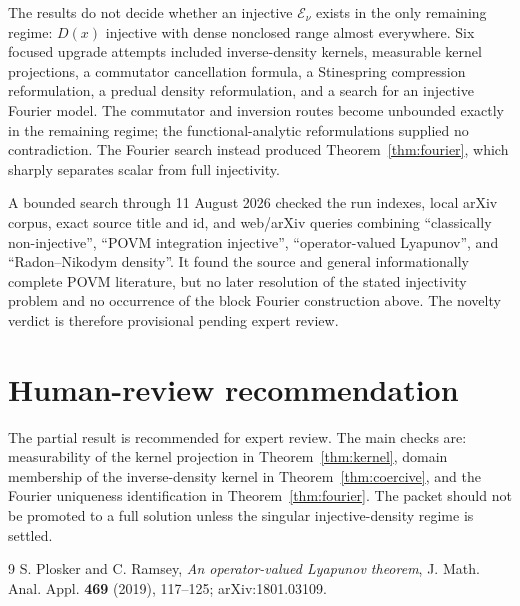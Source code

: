 \documentclass[11pt]{article}
\newcommand{\E}{\mathcal E}
\begin{document}
The results do not decide whether an injective $\E_\nu$ exists in the only
remaining regime: $D(x)$ injective with dense nonclosed range almost
everywhere.  Six focused upgrade attempts included inverse-density kernels,
measurable kernel projections, a commutator cancellation formula, a
Stinespring compression reformulation, a predual density reformulation, and
a search for an injective Fourier model.  The commutator and inversion routes
become unbounded exactly in the remaining regime; the functional-analytic
reformulations supplied no contradiction.  The Fourier search instead
produced Theorem~\ref{thm:fourier}, which sharply separates scalar from full
injectivity.

A bounded search through 11 August 2026 checked the run indexes, local arXiv
corpus, exact source title and id, and web/arXiv queries combining
``classically non-injective'', ``POVM integration injective'',
``operator-valued Lyapunov'', and ``Radon--Nikodym density''.  It found the
source and general informationally complete POVM literature, but no later
resolution of the stated injectivity problem and no occurrence of the block
Fourier construction above.  The novelty verdict is therefore provisional
pending expert review.

\section{Human-review recommendation}

The partial result is recommended for expert review.  The main checks are:
measurability of the kernel projection in Theorem~\ref{thm:kernel}, domain
membership of the inverse-density kernel in Theorem~\ref{thm:coercive}, and
the Fourier uniqueness identification in Theorem~\ref{thm:fourier}.  The
packet should not be promoted to a full solution unless the singular
injective-density regime is settled.

\begin{thebibliography}{9}
S. Plosker and C. Ramsey,
\emph{An operator-valued Lyapunov theorem},
J. Math. Anal. Appl. \textbf{469} (2019), 117--125;
arXiv:1801.03109.
\end{thebibliography}
\end{document}
